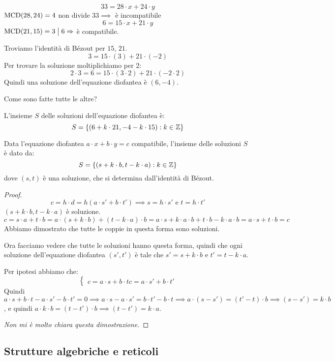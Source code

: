 \begin{exmp}
\[
33 = 28 \cdot x + 24 \cdot y
\]
$\operatorname{MCD}(28, 24) = 4$ non divide $ 33 \implies$ \`e incompatibile
\[
6 = 15 \cdot x + 21 \cdot y
\]
$\operatorname{MCD}(21, 15) = 3 \bigm| 6 \Rightarrow$ \`e compatibile.

Troviamo l'identit\`a di B\'ezout per $15$, $21$.
\[
3 = 15 \cdot (3) + 21 \cdot (-2)
\]
Per trovare la soluzione moltiplichiamo per 2:
\[
2 \cdot 3 = 6 = 15 \cdot (3 \cdot 2) + 21 \cdot (-2 \cdot 2)
\]
Quindi una soluzione dell'equazione diofantea \`e $(6, -4)$.

Come sono fatte tutte le altre?

L'insieme $S$ delle soluzioni dell'equazione diofantea \`e:
\[
S = \{ (6 + k \cdot 21, - 4 - k \cdot 15) : k \in \mathbb{Z} \}
\]
\end{exmp}
\begin{prop}
Data l'equazione diofantea $a \cdot x + b \cdot y = c$ compatibile, l'insieme delle soluzioni $S$ \`e dato da:
\[
S = \{ (s + k \cdot b, t - k \cdot a) : k \in \mathbb{Z} \}
\]
dove $(s, t)$ \`e una soluzione, che si determina dall'identit\`a di B\'ezout.
\end{prop}
\begin{proof}
\[
c = h \cdot d = h (a \cdot s' + b \cdot t') \implies s = h \cdot s' \text{ e } t = h \cdot t'
\]
$(s + k \cdot b, t - k \cdot a)$ \`e soluzione.
\[
c = s \cdot a + t \cdot b = a \cdot (s + k \cdot b) + (t - k \cdot a) \cdot b = 
a \cdot s + k \cdot a \cdot b + t \cdot b - k \cdot a \cdot b = a \cdot s + t \cdot b = c
\]
Abbiamo dimostrato che tutte le coppie in questa forma sono soluzioni.

Ora facciamo vedere che tutte le soluzioni hanno questa forma, quindi che ogni soluzione dell'equazione diofantea $(s', t')$ \`e tale che $s' = s + k \cdot b$ e $t' = t - k \cdot a $.

Per ipotesi abbiamo che:
\[
\begin{cases}
c = a \cdot s + b \cdot t
c = a \cdot s' + b \cdot t'
\end{cases}
\]
Quindi $a \cdot s + b \cdot t - a \cdot s' - b \cdot t' = 0 \implies
a \cdot s - a \cdot s' = b \cdot t' - b \cdot t \implies
a \cdot (s - s') = (t' - t) \cdot b \implies
(s - s') = k \cdot b$, e quindi $a \cdot k \cdot b = (t - t') \cdot b \implies (t - t') = k \cdot a$.

\textit{Non mi \`e molto chiara questa dimostrazione.}
\end{proof}

\subsection{Strutture algebriche e reticoli}

